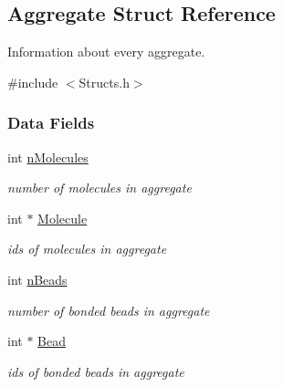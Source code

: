\hypertarget{structAggregate}{}\subsection{Aggregate Struct Reference}
\label{structAggregate}


Information about every aggregate.  




{\ttfamily \#include $<$Structs.\+h$>$}

\subsubsection*{Data Fields}
\begin{DoxyCompactItemize}
\item 
\mbox{\label{structAggregate_a6e1446d643ee52c1700ee1cc98d95325}} 
int \hyperlink{structAggregate_a6e1446d643ee52c1700ee1cc98d95325}{n\+Molecules}
\begin{DoxyCompactList}\small\item\em number of molecules in aggregate \end{DoxyCompactList}\item 
\mbox{\label{structAggregate_a74bfe5399acaab192bd14e273898413b}} 
int $\ast$ \hyperlink{structAggregate_a74bfe5399acaab192bd14e273898413b}{Molecule}
\begin{DoxyCompactList}\small\item\em ids of molecules in aggregate \end{DoxyCompactList}\item 
\mbox{\label{structAggregate_a2255d4811486597cd898f30935bc353b}} 
int \hyperlink{structAggregate_a2255d4811486597cd898f30935bc353b}{n\+Beads}
\begin{DoxyCompactList}\small\item\em number of bonded beads in aggregate \end{DoxyCompactList}\item 
\mbox{\label{structAggregate_ab89b3e89b48b76600adbd78051f25755}} 
int $\ast$ \hyperlink{structAggregate_ab89b3e89b48b76600adbd78051f25755}{Bead}
\begin{DoxyCompactList}\small\item\em ids of bonded beads in aggregate \end{DoxyCompactList}\item 

\end{DoxyCompactItemize}
